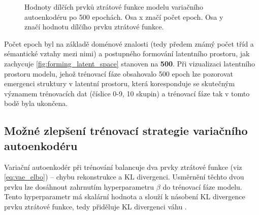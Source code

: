 \begin{figure}[H]
    \centering
    \qquad
    \caption{Hodnoty dílčích prvků ztrátové funkce modelu variačního autoenkodéru po 500 epochách. Osa x značí počet epoch. Osa y značí hodnotu dílčího prvku ztrátové funkce.}
    \label{fig:vae_model_loss_function_terms_converence}
\end{figure}

Počet epoch byl na základě doménové znalosti (tedy předem známý počet tříd a sémantické vztahy mezi nimi) a postupného formování latentního prostoru, jak zachycuje \autoref{fig:forming_latent_space} stanoven na \textbf{500}.
Při vizualizaci latentního prostoru modelu, jehož trénovací fáze obsahovalo 500 epoch lze pozorovat emergenci struktury v latentní prostoru, která koresponduje se skutečným významem trénovacích dat (číslice 0-9, 10 skupin) a trénovací fáze tak v tomto bodě byla ukončena.

\subsection{Možné zlepšení trénovací strategie variačního autoenkodéru}
Variační autoenkodér při trénování balancuje dva prvky ztrátové funkce (viz \autoref{eq:vae_elbo}) – chybu rekonstrukce a KL divergenci.
Usměrnění těchto dvou prvku lze dosáhnout zahrnutím hyperparametru $\beta$ do trénovací fáze modelu. 
Tento hyperparametr má skalární hodnota a slouží k násobení KL divergence prvku ztrátové funkce, tedy přiděluje KL divergenci váhu \cite{Higgins2022}.

